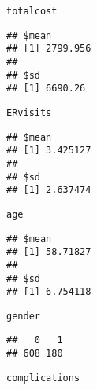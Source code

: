 \documentclass[]{article}
\newenvironment{Shaded}{\begin{snugshade}}{\end{snugshade}}
\newcommand{\KeywordTok}[1]{\textcolor[rgb]{0.13,0.29,0.53}{\textbf{#1}}}
\newcommand{\OperatorTok}[1]{\textcolor[rgb]{0.81,0.36,0.00}{\textbf{#1}}}
\newcommand{\NormalTok}[1]{#1}
\begin{document}
\texttt{totalcost}

\begin{Shaded}
\end{Shaded}

\begin{verbatim}
## $mean
## [1] 2799.956
## 
## $sd
## [1] 6690.26
\end{verbatim}

\texttt{ERvisits}

\begin{Shaded}
\end{Shaded}

\begin{verbatim}
## $mean
## [1] 3.425127
## 
## $sd
## [1] 2.637474
\end{verbatim}

\texttt{age}

\begin{Shaded}
\end{Shaded}

\begin{verbatim}
## $mean
## [1] 58.71827
## 
## $sd
## [1] 6.754118
\end{verbatim}

\texttt{gender}

\begin{Shaded}
\end{Shaded}

\begin{verbatim}
##   0   1 
## 608 180
\end{verbatim}

\texttt{complications}

\begin{Shaded}
\end{Shaded}
\end{document}
